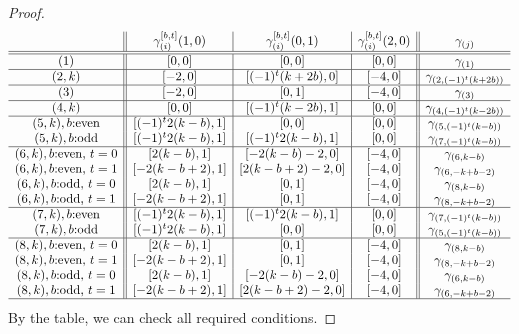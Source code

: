 \documentclass[10pt,a4paper]{amsart}
\begin{document}
\begin{proof}
  {\small
  $$\begin{array}{c||c|c|c||c}
    & \gamma_{(i)}^{[b,t]}(1,0)
    & \gamma_{(i)}^{[b,t]}(0,1)
    & \gamma_{(i)}^{[b,t]}(2,0) & \gamma_{(j)}\\
    \hline
    \hline
    (1) & [0,0] & [0,0] & [0,0] & \gamma_{(1)}\\
    \hline
    (2,k) & [-2,0] & [(-1)^t(k+2b),0] & [-4,0]& \gamma_{(2,(-1)^t(k+2b))}\\
    \hline
    (3) & [-2,0] & [0,1] & [-4,0] & \gamma_{(3)}\\
    \hline
    (4,k) & [0,0] & [(-1)^t(k-2b),1] & [0,0] & \gamma_{(4,(-1)^t(k-2b))}\\
    \hline
    (5,k), \text{$b$:even} & [(-1)^t2(k-b),1] & [0,0] & [0,0] & \gamma_{(5,(-1)^t(k-b))}\\
    (5,k), \text{$b$:odd} & [(-1)^t2(k-b),1]  & [(-1)^t2(k-b),1] & [0,0]
                                & \gamma_{(7,(-1)^t(k-b))}\\
    \hline
    (6,k), \text{$b$:even, $t=0$} & [2(k-b),1] & [-2(k-b)-2,0] & [-4,0] &\gamma_{(6,k-b)}\\
    (6,k), \text{$b$:even, $t=1$} & [-2(k-b+2),1] & [2(k-b+2)-2,0] & [-4,0]&\gamma_{(6,-k+b-2)}\\
    (6,k), \text{$b$:odd, $t=0$} & [2(k-b),1] & [0,1] & [-4,0]&\gamma_{(8,k-b)}\\
    (6,k), \text{$b$:odd, $t=1$} & [-2(k-b+2),1] & [0,1] & [-4,0]&\gamma_{(8,-k+b-2)}\\
    \hline
    (7,k), \text{$b$:even}  & [(-1)^t2(k-b),1] & [(-1)^t2(k-b),1] & [0,0]
                                &\gamma_{(7,(-1)^t(k-b))}\\
    (7,k), \text{$b$:odd}  & [(-1)^t2(k-b),1] & [0,0] & [0,0]
                                &\gamma_{(5,(-1)^t(k-b))}\\
    \hline
    (8,k), \text{$b$:even, $t=0$}& [2(k-b),1] & [0,1] & [-4,0]&\gamma_{(8,k-b)}\\
    (8,k), \text{$b$:even, $t=1$}& [-2(k-b+2),1] & [0,1] & [-4,0]&\gamma_{(8,-k+b-2)}\\
    (8,k), \text{$b$:odd, $t=0$}& [2(k-b),1] & [-2(k-b)-2,0] & [-4,0]&\gamma_{(6,k-b)}\\
    (8,k), \text{$b$:odd, $t=1$}& [-2(k-b+2),1] & [2(k-b+2)-2,0] & [-4,0]&\gamma_{(6,-k+b-2)}\\
    \hline
  \end{array}$$}
  By the table, we can check all required conditions.
\end{proof}
\end{document}
